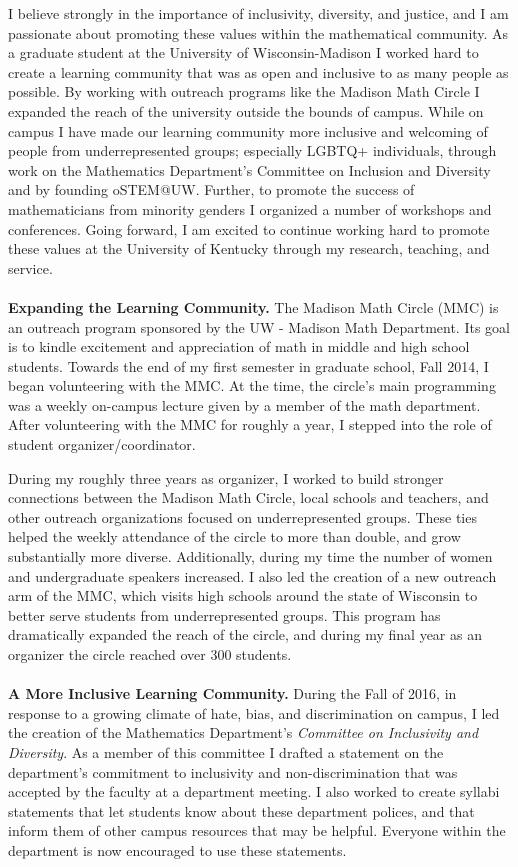 \documentclass[11pt]{article}
\begin{document}
I believe strongly in the importance of inclusivity, diversity, and justice, and I am passionate about promoting these values within the mathematical community. As a graduate student at the University of Wisconsin-Madison I worked hard to create a learning community that was as open and inclusive to as many people as possible. By working with outreach programs like the Madison Math Circle I expanded the reach of the university outside the bounds of campus. While on campus I have made our learning community more inclusive and welcoming of people from underrepresented groups; especially LGBTQ+ individuals, through work on the Mathematics Department's Committee on Inclusion and Diversity and by founding oSTEM@UW. Further, to promote the success of mathematicians from minority genders I organized a number of workshops and conferences. Going forward, I am excited to continue working hard to promote these values at the University of Kentucky through my research, teaching, and service. 
\\
\\
\noindent \textbf{Expanding the Learning Community.} The Madison Math Circle (MMC) is an outreach program sponsored by the UW - Madison Math Department. Its goal is to kindle excitement and appreciation of math in middle and high school students. Towards the end of my first semester in graduate school, Fall 2014, I began volunteering with the MMC. At the time, the circle's main programming was a weekly on-campus lecture given by a member of the math department. After volunteering with the MMC for roughly a year, I stepped into the role of student organizer/coordinator. 

During my roughly three years as organizer, I worked to build stronger connections between the Madison Math Circle, local schools and teachers, and other outreach organizations focused on underrepresented groups. These ties helped the weekly attendance of the circle to more than double, and grow substantially more diverse. Additionally, during my time the number of women and undergraduate speakers increased. I also led the creation of a new outreach arm of the MMC, which visits high schools around the state of Wisconsin to better serve students from underrepresented groups. This program has dramatically expanded the reach of the circle, and during my final year as an organizer the circle reached over 300 students.
\\
\\
\noindent \textbf{A More Inclusive Learning Community.} During the Fall of 2016, in response to a growing climate of hate, bias, and discrimination on campus, I led the creation of the Mathematics Department's \textit{Committee on Inclusivity and Diversity}. As a member of this committee I drafted a statement on the department's commitment to inclusivity and non-discrimination that was accepted by the faculty at a department meeting. I also worked to create syllabi statements that let students know about these department polices, and that inform them of other campus resources that may be helpful. Everyone within the department is now encouraged to use these statements. 
\end{document}
